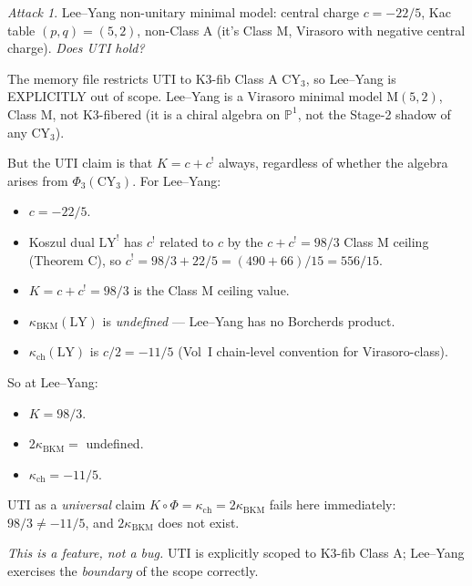 \documentclass[11pt]{amsart}
\theoremstyle{definition}
\theoremstyle{remark}
\newtheorem{attack}[theorem]{Attack}
\newcommand{\kch}{\kappa_{\mathrm{ch}}}
\newcommand{\kBKM}{\kappa_{\mathrm{BKM}}}
\begin{document}
\begin{attack}
Lee--Yang non-unitary minimal model: central charge $c = -22/5$, Kac table
$(p, q) = (5, 2)$, non-Class A (it's Class M, Virasoro with negative central charge).
\emph{Does UTI hold?}

The memory file restricts UTI to K3-fib Class A CY$_3$, so Lee--Yang is EXPLICITLY out of scope.
Lee--Yang is a Virasoro minimal model $\mathrm{M}(5, 2)$, Class M, not K3-fibered (it is a
chiral algebra on $\mathbb{P}^1$, not the Stage-2 shadow of any CY$_3$).

But the UTI claim is that $K = c + c^!$ always, regardless of whether the algebra arises from
$\Phi_3(\text{CY}_3)$. For Lee--Yang:
\begin{itemize}
\item $c = -22/5$.
\item Koszul dual $\mathrm{LY}^!$ has $c^!$ related to $c$ by the $c + c^! = 98/3$ Class M ceiling
(Theorem C), so $c^! = 98/3 + 22/5 = (490 + 66)/15 = 556/15$.
\item $K = c + c^! = 98/3$ is the Class M ceiling value.
\item $\kBKM(\mathrm{LY})$ is \emph{undefined} --- Lee--Yang has no Borcherds product.
\item $\kch(\mathrm{LY})$ is $c/2 = -11/5$ (Vol~I chain-level convention for Virasoro-class).
\end{itemize}

So at Lee--Yang:
\begin{itemize}
\item $K = 98/3$.
\item $2 \kBKM = $ undefined.
\item $\kch = -11/5$.
\end{itemize}

UTI as a \emph{universal} claim $K \circ \Phi = \kch = 2\kBKM$ fails here immediately:
$98/3 \neq -11/5$, and $2\kBKM$ does not exist.

\emph{This is a feature, not a bug.} UTI is explicitly scoped to K3-fib Class A; Lee--Yang
exercises the \emph{boundary} of the scope correctly.
\end{attack}
\end{document}
